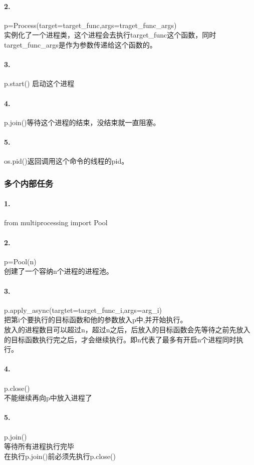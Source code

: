 \documentclass[12pt]{article}
\begin{document}
\begin{CJK}{UTF8}{gbsn}
\paragraph{2.}p=Process(target=target\_func,args=traget\_func\_args)
\\实例化了一个进程类，这个进程会去执行target\_func这个函数，同时target\_func\_args是作为参数传递给这个函数的。
\paragraph{3.}p.start() 启动这个进程
\paragraph{4.}p.join()等待这个进程的结束，没结束就一直阻塞。
\paragraph{5.}os.pid()返回调用这个命令的线程的pid。
\subsubsection{多个内部任务}
\paragraph{1.}from multiprocessing import Pool
\paragraph{2.}p=Pool(n)
\\创建了一个容纳n个进程的进程池。
\paragraph{3.}p.apply\_async(targtet=target\_func\_i,args=arg\_i)
\\把第i个要执行的目标函数和他的参数放入p中,并开始执行。
\\放入的进程数目可以超过n，超过n之后，后放入的目标函数会先等待之前先放入的目标函数执行完之后，才会继续执行。即n代表了最多有开启n个进程同时执行。
\paragraph{4.}p.close()
\\不能继续再向p中放入进程了
\paragraph{5.}p.join()
\\等待所有进程执行完毕
\\在执行p.join()前必须先执行p.close()

\end{CJK}
\end{document}

